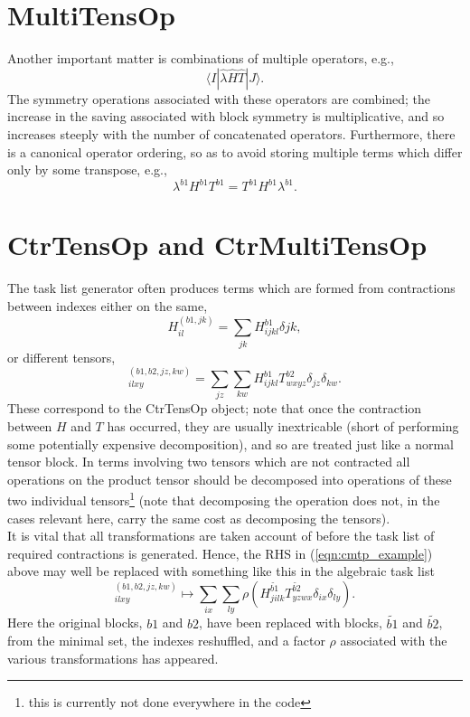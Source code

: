 \section{ MultiTensOp } 
\noindent Another important matter is combinations of multiple operators, e.g.,
\begin{equation}
\langle I | \hat{\lambda}\hat{H}\hat{T} | J \rangle .
\end{equation}
The symmetry operations associated with these operators are combined; the increase in the saving
associated with block symmetry is multiplicative, and so increases steeply with
the number of concatenated operators. Furthermore, there is a canonical
operator ordering, so as to avoid storing multiple terms which differ only by some transpose, 
e.g., 
\begin{equation}
\lambda^{b1}H^{b1}T^{b1} = T^{b1}H^{b1}\lambda^{b1}. 
\label{eqn:tens_block_combined}
\end{equation}
\section{CtrTensOp and CtrMultiTensOp}
The task list generator often produces terms which are formed from contractions between indexes either
on the same,
\begin{equation*}
H^{(b1,jk)}_{il} = \sum_{jk} H^{b1}_{ijkl}\delta{jk},
\end{equation*}
or different tensors, 
\begin{equation}
[HT]^{(b1,b2,jz,kw)}_{ilxy} = \sum_{jz} \sum_{kw} H^{b1}_{ijkl}T^{b2}_{wxyz}\delta_{jz}\delta_{kw}.
\label{eqn:cmtp_example}
\end{equation}
These correspond to the CtrTensOp object; note that once the contraction between $H$ and $T$ has occurred, they
are usually inextricable (short of performing some potentially expensive decomposition), and so 
are treated just like a normal tensor block. In terms involving two
tensors which are not contracted all operations on the product tensor should be decomposed into operations of these 
two individual tensors\footnote{this is currently not done everywhere in the code} (note that decomposing the
operation does not, in the cases relevant here, carry the same cost as decomposing the tensors).\\

\noindent It is vital that all transformations are taken account of before the task list of required contractions
is generated. Hence, the RHS in (\ref{eqn:cmtp_example}) above may well be replaced with something like this in
the algebraic task list
\begin{equation}
[HT]^{(b1,b2,jz,kw)}_{ilxy} \mapsto \sum_{ix} \sum_{ly} \rho(H^{\tilde{b1}}_{jilk}T^{\tilde{b2}}_{yzwx}\delta_{ix}\delta_{ly}).
\label{eqn:cmtp_example_symm}
\end{equation}
\noindent Here the original blocks,  $b1$ and $b2$, have been replaced with blocks, $\tilde{b1}$ and $\tilde{b2}$,
from the minimal set, the indexes reshuffled, and a factor $\rho$ associated with the various transformations has appeared. 

